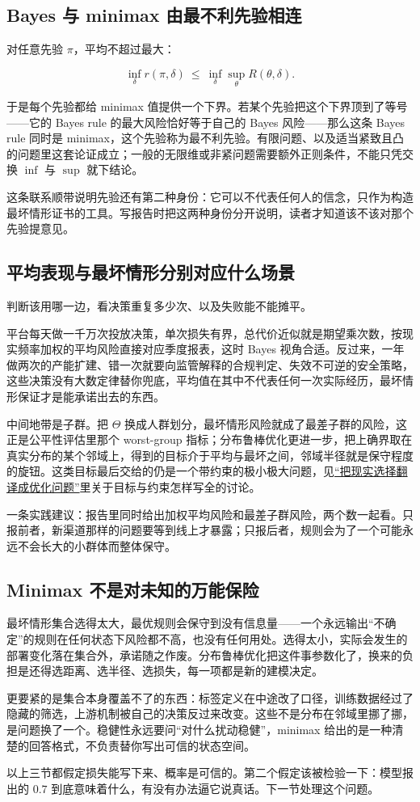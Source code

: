 \subsection{Bayes 与 minimax 由最不利先验相连}

对任意先验 \(\pi\)，平均不超过最大：

\[
\inf_\delta r(\pi,\delta)\ \le\ \inf_\delta\sup_\theta R(\theta,\delta).
\]

于是每个先验都给 minimax 值提供一个下界。若某个先验把这个下界顶到了等号——它的 Bayes rule 的最大风险恰好等于自己的 Bayes 风险——那么这条 Bayes rule 同时是 minimax，这个先验称为最不利先验。有限问题、以及适当紧致且凸的问题里这套论证成立；一般的无限维或非紧问题需要额外正则条件，不能只凭交换 \(\inf\) 与 \(\sup\) 就下结论。

这条联系顺带说明先验还有第二种身份：它可以不代表任何人的信念，只作为构造最坏情形证书的工具。写报告时把这两种身份分开说明，读者才知道该不该对那个先验提意见。

\subsection{平均表现与最坏情形分别对应什么场景}

判断该用哪一边，看决策重复多少次、以及失败能不能摊平。

平台每天做一千万次投放决策，单次损失有界，总代价近似就是期望乘次数，按现实频率加权的平均风险直接对应季度报表，这时 Bayes 视角合适。反过来，一年做两次的产能扩建、错一次就要向监管解释的合规判定、失效不可逆的安全策略，这些决策没有大数定律替你兜底，平均值在其中不代表任何一次实际经历，最坏情形保证才是能承诺出去的东西。

中间地带是子群。把 \(\Theta\) 换成人群划分，最坏情形风险就成了最差子群的风险，这正是公平性评估里那个 worst-group 指标；分布鲁棒优化更进一步，把上确界取在真实分布的某个邻域上，得到的目标介于平均与最坏之间，邻域半径就是保守程度的旋钮。这类目标最后交给的仍是一个带约束的极小极大问题，见\hyperref[sec:09-Convex-Optimization/01-Optimization-Foundations/01]{``把现实选择翻译成优化问题''}里关于目标与约束怎样写全的讨论。

一条实践建议：报告里同时给出加权平均风险和最差子群风险，两个数一起看。只报前者，新渠道那样的问题要等到线上才暴露；只报后者，规则会为了一个可能永远不会长大的小群体而整体保守。

\subsection{Minimax 不是对未知的万能保险}

最坏情形集合选得太大，最优规则会保守到没有信息量——一个永远输出``不确定''的规则在任何状态下风险都不高，也没有任何用处。选得太小，实际会发生的部署变化落在集合外，承诺随之作废。分布鲁棒优化把这件事参数化了，换来的负担是还得选距离、选半径、选损失，每一项都是新的建模决定。

更要紧的是集合本身覆盖不了的东西：标签定义在中途改了口径，训练数据经过了隐藏的筛选，上游机制被自己的决策反过来改变。这些不是分布在邻域里挪了挪，是问题换了一个。稳健性永远要问``对什么扰动稳健''，minimax 给出的是一种清楚的回答格式，不负责替你写出可信的状态空间。

以上三节都假定损失能写下来、概率是可信的。第二个假定该被检验一下：模型报出的 \(0.7\) 到底意味着什么，有没有办法逼它说真话。下一节处理这个问题。
